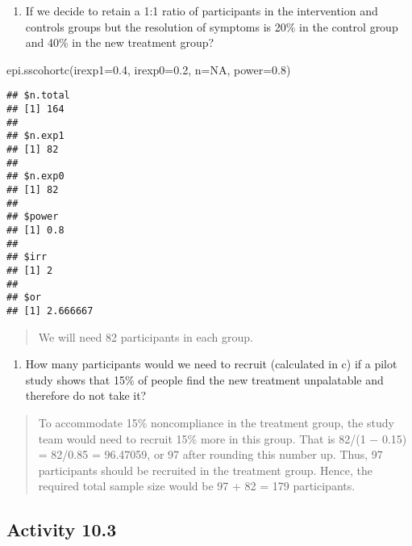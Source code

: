 \documentclass[
]{memoir}
\newenvironment{Shaded}{\begin{snugshade}}{\end{snugshade}}
\newcommand{\AttributeTok}[1]{\textcolor[rgb]{0.77,0.63,0.00}{#1}}
\newcommand{\ConstantTok}[1]{\textcolor[rgb]{0.00,0.00,0.00}{#1}}
\newcommand{\FloatTok}[1]{\textcolor[rgb]{0.00,0.00,0.81}{#1}}
\newcommand{\FunctionTok}[1]{\textcolor[rgb]{0.00,0.00,0.00}{#1}}
\newcommand{\NormalTok}[1]{#1}
\providecommand{\tightlist}{%
  \setlength{\itemsep}{0pt}\setlength{\parskip}{0pt}}
\begin{document}
\begin{enumerate}
\def\labelenumi{\alph{enumi})}
\setcounter{enumi}{2}
\tightlist
\item
  If we decide to retain a 1:1 ratio of participants in the intervention and controls groups but the resolution of symptoms is 20\% in the control group and 40\% in the new treatment group?
\end{enumerate}

\begin{Shaded}
\begin{Highlighting}[]
\FunctionTok{epi.sscohortc}\NormalTok{(}\AttributeTok{irexp1=}\FloatTok{0.4}\NormalTok{, }\AttributeTok{irexp0=}\FloatTok{0.2}\NormalTok{, }\AttributeTok{n=}\ConstantTok{NA}\NormalTok{, }\AttributeTok{power=}\FloatTok{0.8}\NormalTok{)}
\end{Highlighting}
\end{Shaded}

\begin{verbatim}
## $n.total
## [1] 164
## 
## $n.exp1
## [1] 82
## 
## $n.exp0
## [1] 82
## 
## $power
## [1] 0.8
## 
## $irr
## [1] 2
## 
## $or
## [1] 2.666667
\end{verbatim}

\begin{quote}
We will need 82 participants in each group.
\end{quote}

\begin{enumerate}
\def\labelenumi{\alph{enumi})}
\setcounter{enumi}{3}
\tightlist
\item
  How many participants would we need to recruit (calculated in c) if a pilot study shows that 15\% of people find the new treatment unpalatable and therefore do not take it?
\end{enumerate}

\begin{quote}
To accommodate 15\% noncompliance in the treatment group, the study team would need to recruit 15\% more in this group. That is 82/(1 − 0.15) = 82/0.85 = 96.47059, or 97 after rounding this number up. Thus, 97 participants should be recruited in the treatment group. Hence, the required total sample size would be 97 + 82 = 179 participants.
\end{quote}

\hypertarget{activity-10.3}{%
\subsection*{Activity 10.3}\label{activity-10.3}}
\end{document}
